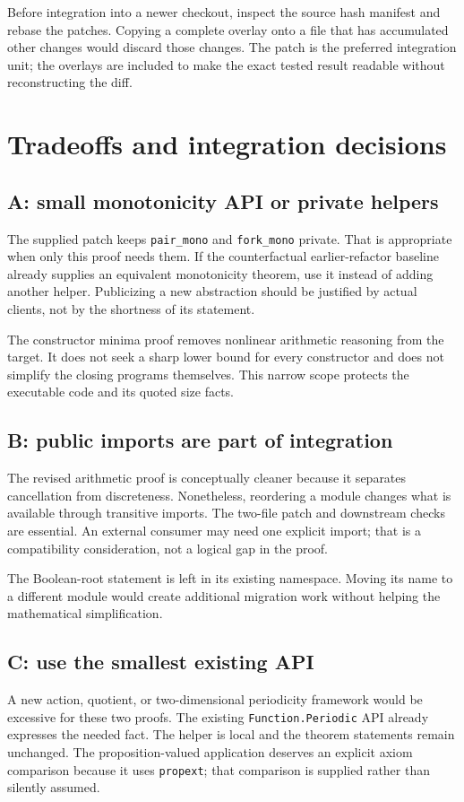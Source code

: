 \documentclass[11pt,letterpaper]{article}
\newcommand{\code}[1]{\nolinkurl{#1}}
\begin{document}
Before integration into a newer checkout, inspect the source hash manifest and rebase the patches. Copying a complete overlay onto a file that has accumulated other changes would discard those changes. The patch is the preferred integration unit; the overlays are included to make the exact tested result readable without reconstructing the diff.

\section{Tradeoffs and integration decisions}
\subsection{A: small monotonicity API or private helpers}
The supplied patch keeps \code{pair_mono} and \code{fork_mono} private. That is appropriate when only this proof needs them. If the counterfactual earlier-refactor baseline already supplies an equivalent monotonicity theorem, use it instead of adding another helper. Publicizing a new abstraction should be justified by actual clients, not by the shortness of its statement.

The constructor minima proof removes nonlinear arithmetic reasoning from the target. It does not seek a sharp lower bound for every constructor and does not simplify the closing programs themselves. This narrow scope protects the executable code and its quoted size facts.

\subsection{B: public imports are part of integration}
The revised arithmetic proof is conceptually cleaner because it separates cancellation from discreteness. Nonetheless, reordering a module changes what is available through transitive imports. The two-file patch and downstream checks are essential. An external consumer may need one explicit import; that is a compatibility consideration, not a logical gap in the proof.

The Boolean-root statement is left in its existing namespace. Moving its name to a different module would create additional migration work without helping the mathematical simplification.

\subsection{C: use the smallest existing API}
A new action, quotient, or two-dimensional periodicity framework would be excessive for these two proofs. The existing \code{Function.Periodic} API already expresses the needed fact. The helper is local and the theorem statements remain unchanged. The proposition-valued application deserves an explicit axiom comparison because it uses \code{propext}; that comparison is supplied rather than silently assumed.
\end{document}
